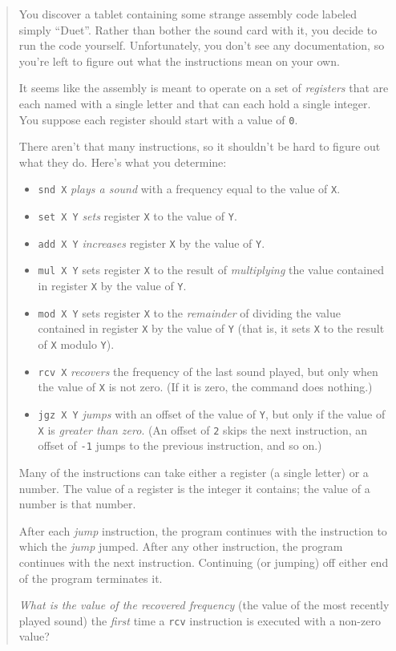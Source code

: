 \documentclass[]{article}
\begin{document}
\begin{quote}
You discover a tablet containing some strange assembly code labeled simply
``Duet''. Rather than bother the sound card with it, you decide to run the code
yourself. Unfortunately, you don't see any documentation, so you're left to
figure out what the instructions mean on your own.

It seems like the assembly is meant to operate on a set of \emph{registers} that
are each named with a single letter and that can each hold a single integer. You
suppose each register should start with a value of \texttt{0}.

There aren't that many instructions, so it shouldn't be hard to figure out what
they do. Here's what you determine:

\begin{itemize}
\tightlist
\item
  \texttt{snd\ X} \emph{plays a sound} with a frequency equal to the value of
  \texttt{X}.
\item
  \texttt{set\ X\ Y} \emph{sets} register \texttt{X} to the value of \texttt{Y}.
\item
  \texttt{add\ X\ Y} \emph{increases} register \texttt{X} by the value of
  \texttt{Y}.
\item
  \texttt{mul\ X\ Y} sets register \texttt{X} to the result of
  \emph{multiplying} the value contained in register \texttt{X} by the value of
  \texttt{Y}.
\item
  \texttt{mod\ X\ Y} sets register \texttt{X} to the \emph{remainder} of
  dividing the value contained in register \texttt{X} by the value of \texttt{Y}
  (that is, it sets \texttt{X} to the result of \texttt{X} modulo \texttt{Y}).
\item
  \texttt{rcv\ X} \emph{recovers} the frequency of the last sound played, but
  only when the value of \texttt{X} is not zero. (If it is zero, the command
  does nothing.)
\item
  \texttt{jgz\ X\ Y} \emph{jumps} with an offset of the value of \texttt{Y}, but
  only if the value of \texttt{X} is \emph{greater than zero}. (An offset of
  \texttt{2} skips the next instruction, an offset of \texttt{-1} jumps to the
  previous instruction, and so on.)
\end{itemize}

Many of the instructions can take either a register (a single letter) or a
number. The value of a register is the integer it contains; the value of a
number is that number.

After each \emph{jump} instruction, the program continues with the instruction
to which the \emph{jump} jumped. After any other instruction, the program
continues with the next instruction. Continuing (or jumping) off either end of
the program terminates it.

\emph{What is the value of the recovered frequency} (the value of the most
recently played sound) the \emph{first} time a \texttt{rcv} instruction is
executed with a non-zero value?
\end{quote}
\end{document}
